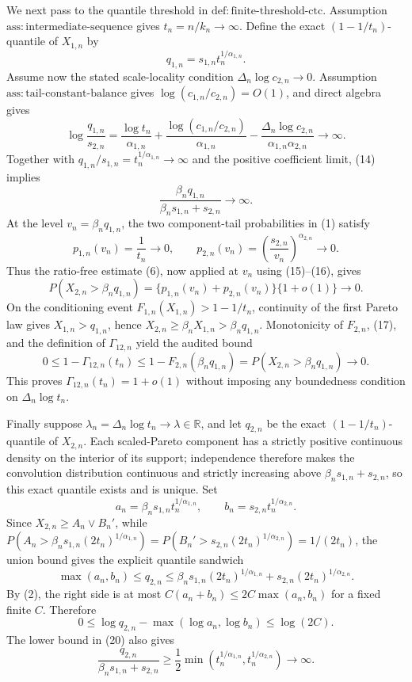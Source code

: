 We next pass to the quantile threshold in \(\mathrm{def{:}finite\text{-}threshold\text{-}ctc}\).  Assumption \(\mathrm{ass{:}intermediate\text{-}sequence}\) gives \(t_n=n/k_n\to\infty\).  Define the exact \((1-1/t_n)\)-quantile of \(X_{1,n}\) by
\[
q_{1,n}=s_{1,n}t_n^{1/\alpha_{1,n}}.
\tag{13}
\]
Assume now the stated scale-locality condition \(\Delta_n\log c_{2,n}\to0\).  Assumption \(\mathrm{ass{:}tail\text{-}constant\text{-}balance}\) gives \(\log(c_{1,n}/c_{2,n})=O(1)\), and direct algebra gives
\[
\log\frac{q_{1,n}}{s_{2,n}}
=\frac{\log t_n}{\alpha_{1,n}}
 +\frac{\log(c_{1,n}/c_{2,n})}{\alpha_{1,n}}
 -\frac{\Delta_n\log c_{2,n}}{\alpha_{1,n}\alpha_{2,n}}
\longrightarrow\infty.
\tag{14}
\]
Together with \(q_{1,n}/s_{1,n}=t_n^{1/\alpha_{1,n}}\to\infty\) and the positive coefficient limit, (14) implies
\[
\frac{\beta_nq_{1,n}}{\beta_ns_{1,n}+s_{2,n}}\to\infty.
\tag{15}
\]
At the level \(v_n=\beta_nq_{1,n}\), the two component-tail probabilities in (1) satisfy
\[
p_{1,n}(v_n)=\frac1{t_n}\to0,
\qquad
p_{2,n}(v_n)=\left(\frac{s_{2,n}}{v_n}\right)^{\alpha_{2,n}}\to0.
\tag{16}
\]
Thus the ratio-free estimate (6), now applied at \(v_n\) using (15)--(16), gives
\[
P(X_{2,n}>\beta_nq_{1,n})
=\{p_{1,n}(v_n)+p_{2,n}(v_n)\}\{1+o(1)\}\to0.
\tag{17}
\]
On the conditioning event \(F_{1,n}(X_{1,n})>1-1/t_n\), continuity of the first Pareto law gives \(X_{1,n}>q_{1,n}\), hence \(X_{2,n}\geq\beta_nX_{1,n}>\beta_nq_{1,n}\).  Monotonicity of \(F_{2,n}\), (17), and the definition of \(\Gamma_{12,n}\) yield the audited bound
\[
0\leq1-\Gamma_{12,n}(t_n)
\leq1-F_{2,n}(\beta_nq_{1,n})
=P(X_{2,n}>\beta_nq_{1,n})\to0.
\tag{18}
\]
This proves \(\Gamma_{12,n}(t_n)=1+o(1)\) without imposing any boundedness condition on \(\Delta_n\log t_n\).

Finally suppose \(\lambda_n=\Delta_n\log t_n\to\lambda\in\mathbb R\), and let \(q_{2,n}\) be the exact \((1-1/t_n)\)-quantile of \(X_{2,n}\).  Each scaled-Pareto component has a strictly positive continuous density on the interior of its support; independence therefore makes the convolution distribution continuous and strictly increasing above \(\beta_ns_{1,n}+s_{2,n}\), so this exact quantile exists and is unique.  Set
\[
a_n=\beta_ns_{1,n}t_n^{1/\alpha_{1,n}},
\qquad b_n=s_{2,n}t_n^{1/\alpha_{2,n}}.
\tag{19}
\]
Since \(X_{2,n}\geq A_n\vee B_n'\), while
\(P(A_n>\beta_ns_{1,n}(2t_n)^{1/\alpha_{1,n}})=P(B_n'>s_{2,n}(2t_n)^{1/\alpha_{2,n}})=1/(2t_n)\), the union bound gives the explicit quantile sandwich
\[
\max(a_n,b_n)\leq q_{2,n}
\leq\beta_ns_{1,n}(2t_n)^{1/\alpha_{1,n}}
 +s_{2,n}(2t_n)^{1/\alpha_{2,n}}.
\tag{20}
\]
By (2), the right side is at most \(C(a_n+b_n)\leq2C\max(a_n,b_n)\) for a fixed finite \(C\).  Therefore
\[
0\leq\log q_{2,n}-\max(\log a_n,\log b_n)\leq\log(2C).
\tag{21}
\]
The lower bound in (20) also gives
\[
\frac{q_{2,n}}{\beta_ns_{1,n}+s_{2,n}}
\geq\frac12\min\!\left(t_n^{1/\alpha_{1,n}},t_n^{1/\alpha_{2,n}}\right)
\longrightarrow\infty.
\tag{22}
\]

